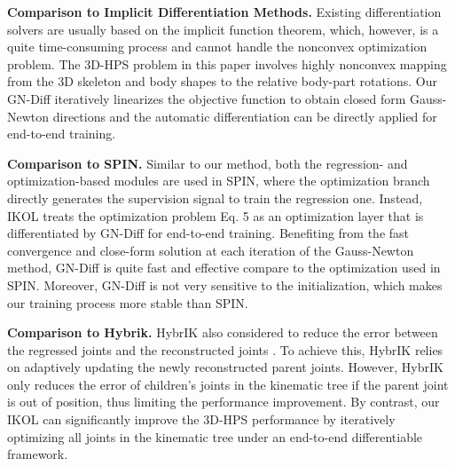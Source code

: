 \documentclass[letterpaper]{article} \usepackage{aaai23}  \usepackage{times}  \usepackage{helvet}  \usepackage{courier}  \usepackage[hyphens]{url}  \usepackage{graphicx} \urlstyle{rm} \def\UrlFont{\rm}  \usepackage{natbib}  \usepackage{caption} \frenchspacing  \setlength{\pdfpagewidth}{8.5in}  \setlength{\pdfpageheight}{11in}  \usepackage{algorithm}
\begin{document}
\noindent\textbf{Comparison to Implicit Differentiation Methods.}
Existing differentiation solvers are usually based on the implicit function theorem, which, however, is a quite time-consuming process and cannot handle the nonconvex optimization problem. The 3D-HPS problem in this paper involves highly nonconvex mapping from the 3D skeleton and body shapes to the relative body-part rotations. Our GN-Diff iteratively linearizes the objective function to obtain closed form Gauss-Newton directions  and the automatic differentiation can be directly applied for end-to-end training. 

\noindent\textbf{Comparison to SPIN.} Similar to our method, both the regression- and optimization-based modules are used in SPIN, where the optimization branch directly generates the supervision signal to train the regression one. 
Instead, IKOL treats the optimization problem  Eq. 5 as an optimization layer that is differentiated by GN-Diff for end-to-end training. Benefiting from the fast convergence and close-form solution at each iteration of the Gauss-Newton method, GN-Diff is quite fast and effective compare to the optimization used in SPIN. Moreover, GN-Diff is not very sensitive to the initialization, which makes our training process more stable than SPIN.  











\noindent\textbf{Comparison to Hybrik.}
HybrIK also considered to reduce the error between the regressed joints  and the reconstructed joints . To achieve this, HybrIK relies on adaptively updating the newly reconstructed parent joints. However, HybrIK only reduces the error of children's joints in the kinematic tree if the parent joint is out of position, thus limiting the performance improvement. By contrast, our IKOL can significantly improve the 3D-HPS performance by iteratively optimizing all joints in the kinematic tree under an end-to-end differentiable framework.
\end{document}
